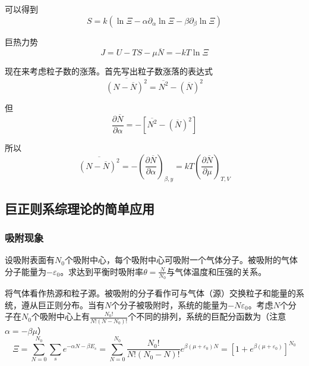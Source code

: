 \documentclass[UTF8]{ctexart}
\begin{document}
\noindent 可以得到
\begin{equation}
S=k\left(\ln \Xi-\alpha \partial_{\alpha} \ln \Xi-\beta \partial_{\beta} \ln \Xi\right)
\end{equation}

\noindent 巨热力势
\begin{equation}
J=U-T S-\mu \overline{N}=-k T \ln \Xi
\end{equation}

	现在来考虑粒子数的涨落。首先写出粒子数涨落的表达式
	\begin{equation}
	\overline{\left(N-\overline{N}\right)^{2}}=\overline{N^{2}}-\left(\overline{N}\right)^2
	\end{equation}
	
\noindent 但
\begin{equation}
	\frac{\partial \overline{N}}{\partial \alpha} = -\left[\overline{N^{2}}-\left(\overline{N}\right)^2\right]
\end{equation}

\noindent 所以
\begin{equation}
	\overline{\left(N-\overline{N}\right)^{2}}=-\left(\frac{\partial \overline{N}}{\partial \alpha}\right)_{\beta,y}=kT\left(\frac{\partial \overline{N}}{\partial \mu}\right)_{T,V}
\end{equation}

	\subsection{巨正则系综理论的简单应用}
	\subsubsection{吸附现象}
	
	设吸附表面有$ N_{0} $个吸附中心，每个吸附中心可吸附一个气体分子。被吸附的气体分子能量为$ -\varepsilon_{0} $。求达到平衡时吸附率$ \theta=\frac{N}{N_{0}} $与气体温度和压强的关系。
	
	将气体看作热源和粒子源。被吸附的分子看作可与气体（源）交换粒子和能量的系统，遵从巨正则分布。当有$ N $个分子被吸附时，系统的能量为$ -N\varepsilon_{0} $。考虑$ N $个分子在$ N_{0} $个吸附中心上有$ \frac{N_{0} !}{N! \left(N-N_{0}\right) !} $个不同的排列，系统的巨配分函数为（注意$ \alpha=-\beta \mu $）
	\begin{equation}
	\Xi=\sum_{N=0}^{N_{0}} \sum_{s} e^{-\alpha N-\beta E_{s}}=\sum_{N=0}^{N_{0}} \frac{N_{0} !}{N !\left(N_{0}-N\right) !} e^{\beta\left(\mu+\varepsilon_{0}\right) N}=\left[1+e^{\beta\left(\mu+\varepsilon_{0}\right)}\right]^{N_{0}}
	\end{equation}
	
\end{document}
